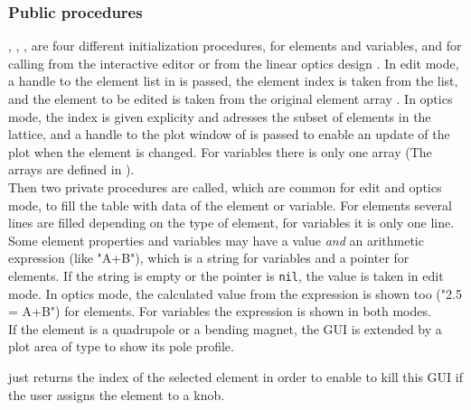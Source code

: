 \documentclass[12pt]{article}
\newcommand\code[1]{{\tt #1}}
\newcommand\guico[1]{{\color{blue}\code{#1}}}
\newcommand{\unico}[1]{{\color{burntorange}\code{#1}}}
\newcommand{\opagui}[1]{\colorbox{blue!20}{{\color{black}\code{#1}}}}
\newcommand{\ogui}[1]{\hyperref[#1]{\opagui{#1}}}
\newcommand{\opaguif}[1]{\colorbox{violet!30}{{\color{black}\code{#1}}}}
\newcommand{\oguif}[1]{\hyperref[#1]{\opaguif{#1}}}
\newcommand{\opauni}[1]{\colorbox{orange!30}{{\color{black}\code{#1}}}}
\newcommand{\ouni}[1]{\hyperref[#1]{\opauni{#1}}}
\newcommand{\ppro}[1]{\subsubsection*{Public procedures} #1}
\begin{document}
\ppro{
\guico{InitE}, \guico{InitEVar}, \guico{InitO},  \guico{InitOVar} are four different initialization procedures, for elements and variables, and for calling from the interactive editor \ogui{opaeditor} or from the linear optics design \ogui{opalinop}. In edit mode, a handle to the element list in \ogui{opamenu} is passed, the element index is taken from the list, and the element to be edited is taken from the original element array \unico{Elem}. In optics mode, the index is given explicity and adresses the \unico{Ella} subset of elements in the lattice, and a handle to the plot window of \ogui{opalinop} is passed to enable an update of the plot when the element is changed. For variables there is only one array \unico{Variable} (The arrays are defined in \ouni{globlib}). \\
Then two private procedures are called, which are common for edit and optics mode, to fill the table with data of the element or variable. For elements several lines are filled depending on the type of element, for variables it is only one line. Some element properties and variables may have a value {\em and} an arithmetic expression (like "A+B"), which is a string for variables and a pointer for elements. If the string is empty or the pointer is \code{nil}, the value is taken in edit mode. In optics mode, the calculated value from the expression is shown too ("2.5 = A+B") for elements. For variables the expression is shown in both modes.\\
If the element is a quadrupole or a bending magnet, the GUI is extended by a plot area of type \oguif{comfigureframe} to show its pole profile.

\guico{getJelem} just returns the index of the selected element in order to enable \ogui{opalinop} to kill this GUI if the user assigns the element to a knob.
}
\end{document}
